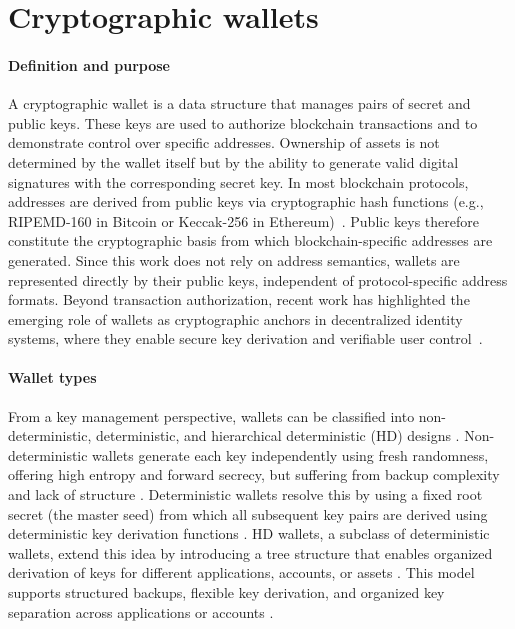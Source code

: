\section{Cryptographic wallets}
\label{sec:blockchain-wallets}


\paragraph{Definition and purpose}
A cryptographic wallet is a data structure that manages pairs of secret and public keys. These keys are used to authorize blockchain transactions and to demonstrate control over specific addresses. Ownership of assets is not determined by the wallet itself but by the ability to generate valid digital signatures with the corresponding secret key. In most blockchain protocols, addresses are derived from public keys via cryptographic hash functions (e.g., RIPEMD-160 in Bitcoin or Keccak-256 in Ethereum)~\cite{buterin2014ethereum}. Public keys therefore constitute the cryptographic basis from which blockchain-specific addresses are generated. Since this work does not rely on address semantics, wallets are represented directly by their public keys, independent of protocol-specific address formats. Beyond transaction authorization, recent work has highlighted the emerging role of wallets as cryptographic anchors in decentralized identity systems, where they enable secure key derivation and verifiable user control~\cite{Das2019,Das2021}.


\paragraph{Wallet types}
From a key management perspective, wallets can be classified into non-deterministic, deterministic, and hierarchical deterministic (HD) designs \cite{antonopoulos2023}. Non-deterministic wallets generate each key independently using fresh randomness, offering high entropy and forward secrecy, but suffering from backup complexity and lack of structure \cite{narayanan2016bitcoin}. Deterministic wallets resolve this by using a fixed root secret (the master seed) from which all subsequent key pairs are derived using deterministic key derivation functions \cite{Das2019}. HD wallets, a subclass of deterministic wallets, extend this idea by introducing a tree structure that enables organized derivation of keys for different applications, accounts, or assets \cite{bip32, bip44}. This model supports structured backups, flexible key derivation, and organized key separation across applications or accounts \cite{antonopoulos2023}.

